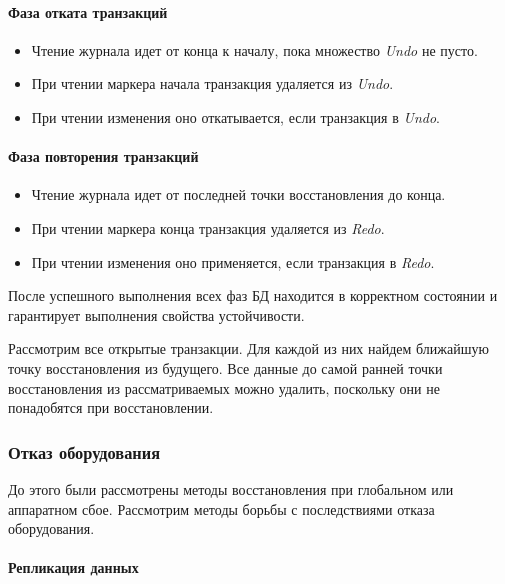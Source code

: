 \paragraph{Фаза отката транзакций}

\begin{itemize}
	\item Чтение журнала идет от конца к началу, пока множество \textit{Undo} не пусто.
	\item При чтении маркера начала транзакция удаляется из \textit{Undo}.
	\item При чтении изменения оно откатывается, если транзакция в \textit{Undo}.
\end{itemize}

\paragraph{Фаза повторения транзакций}

\begin{itemize}
	\item Чтение журнала идет от последней точки восстановления до конца.
	\item При чтении маркера конца транзакция удаляется из \textit{Redo}.
	\item При чтении изменения оно применяется, если транзакция в \textit{Redo}.
\end{itemize}

\begin{proposition}
	После успешного выполнения всех фаз БД находится в корректном состоянии и гарантирует выполнения
	свойства устойчивости.
\end{proposition}

\begin{proposition}
	Рассмотрим все открытые транзакции. Для каждой из них найдем ближайшую точку восстановления из
	будущего. Все данные до самой ранней точки восстановления из рассматриваемых можно удалить,
	поскольку они не понадобятся при восстановлении.
\end{proposition}

\subsubsection{Отказ оборудования}

До этого были рассмотрены методы восстановления при глобальном или аппаратном сбое. Рассмотрим
методы борьбы с последствиями отказа оборудования.

\paragraph{Репликация данных}

